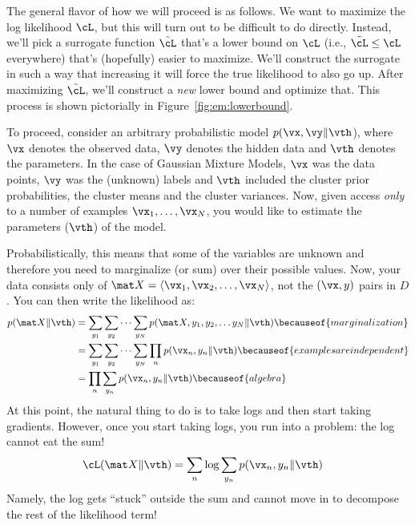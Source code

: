 
The general flavor of how we will proceed is as follows.  We want to
maximize the log likelihood $\cL$, but this will turn out to be
difficult to do directly.  Instead, we'll pick a surrogate function
$\tilde\cL$ that's a lower bound on $\cL$ (i.e., $\tilde\cL \leq \cL$
everywhere) that's (hopefully) easier to maximize.  We'll construct
the surrogate in such a way that increasing it will force the true
likelihood to also go up.  After maximizing $\tilde\cL$, we'll
construct a \emph{new} lower bound and optimize that.  This process is
shown pictorially in Figure~\ref{fig:em:lowerbound}.

To proceed, consider an arbitrary probabilistic model $p(\vx,\vy \|
\vth$), where $\vx$ denotes the observed data, $\vy$ denotes the
hidden data and $\vth$ denotes the parameters.  In the case of
Gaussian Mixture Models, $\vx$ was the data points, $\vy$ was the
(unknown) labels and $\vth$ included the cluster prior probabilities,
the cluster means and the cluster variances.  Now, given access
\emph{only} to a number of examples $\vx_1, \dots, \vx_N$, you would
like to estimate the parameters ($\vth$) of the model.

Probabilistically, this means that some of the variables are unknown
and therefore you need to marginalize (or sum) over their possible
values.  Now, your data consists only of $\mat X = \langle \vx_1,
\vx_2, \dots, \vx_N \rangle$, not the $(\vx,y)$ pairs in $D$.  You can
then write the likelihood as:
%
\begin{align}
  p(\mat X \| \vth)
  &= \sum_{y_1} \sum_{y_2} \cdots \sum_{y_N}  p(\mat X, y_1, y_2, \dots y_N \| \vth)  \becauseof{marginalization}\\
  &= \sum_{y_1} \sum_{y_2} \cdots \sum_{y_N} \prod_n p(\vx_n, y_n \| \vth) \becauseof{examples are independent}\\
  &= \prod_n \sum_{y_n} p(\vx_n, y_n \| \vth) \becauseof{algebra}
\end{align}
%
At this point, the natural thing to do is to take logs and then start
taking gradients.  However, once you start taking logs, you run into a
problem: the log cannot eat the sum!
%
\begin{align}
  \cL(\mat X \| \vth)
  &= \sum_n \log \sum_{y_n} p(\vx_n, y_n \| \vth)
\end{align}
%
Namely, the log gets ``stuck'' outside the sum and cannot move in to
decompose the rest of the likelihood term!

